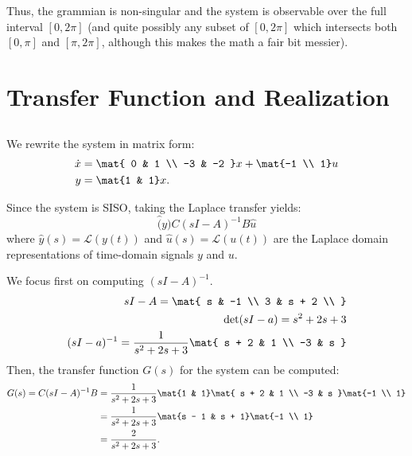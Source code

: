 \documentclass{homework}
\begin{document}
Thus, the grammian is non-singular and the system is observable over the full
interval $[0, 2\pi]$ (and quite possibly any subset of $[0, 2\pi]$ which intersects
both $[0, \pi]$ and $[\pi, 2\pi]$, although this makes the math a fair bit messier).

\section{Transfer Function and Realization}
\subsection{}
We rewrite the system in matrix form:
\begin{align*}
    \dot{x} &= \mat{
        0 & 1 \\
        -3 & -2
    } x + \mat{-1 \\ 1} u \\
    y &= \mat{1 & 1} x.
\end{align*}

Since the system is SISO, taking the Laplace transfer yields:
\begin{equation*}
    \hat(y) C(sI - A)^{-1} B \hat{u}
\end{equation*}
where $\hat{y}(s) = \mathcal{L}(y(t))$ and $\hat{u}(s) = \mathcal{L}(u(t))$
are the Laplace domain representations of time-domain signals $y$ and $u$.

We focus first on computing $(sI - A)^{-1}$.
\begin{align*}
    sI - A = \mat{
        s & -1 \\
        3 & s + 2 \\
    } \\
    \detr(sI - a) = s^2 + 2s + 3 \\
    (sI - a)^{-1} = \frac{1}{s^2 + 2s + 3} \mat{
        s + 2 & 1 \\
        -3 & s 
    } \\
\end{align*}
Then, the transfer function $G(s)$ for the system can be computed:
\begin{align*}
    G(s) = C(sI - A)^{-1} B &= \frac{1}{s^2 + 2s + 3} \mat{1 & 1} \mat{
        s + 2 & 1 \\
        -3 & s 
    } \mat{-1 \\ 1} \\
    &= \frac{1}{s^2 + 2s + 3} \mat{s - 1 & s + 1} \mat{-1 \\ 1} \\
    &= \frac{2}{s^2 + 2s + 3}.
\end{align*}
\end{document}
